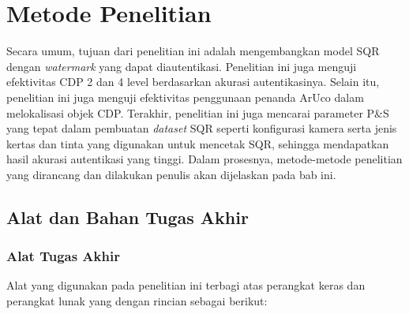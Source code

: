 \chapter{Metode Penelitian}
Secara umum, tujuan dari penelitian ini adalah mengembangkan model SQR dengan \emph{watermark} yang dapat diautentikasi. Penelitian ini juga menguji
efektivitas CDP 2 dan 4 level berdasarkan akurasi autentikasinya. Selain itu, penelitian ini juga menguji efektivitas penggunaan penanda ArUco dalam
melokalisasi objek CDP. Terakhir, penelitian ini juga mencarai parameter P\&S yang tepat dalam pembuatan \emph{dataset} SQR seperti konfigurasi kamera serta
jenis kertas dan tinta yang digunakan untuk mencetak SQR, sehingga mendapatkan hasil akurasi autentikasi yang tinggi. Dalam prosesnya, metode-metode penelitian
yang dirancang dan dilakukan penulis akan dijelaskan pada bab ini.

\section{Alat dan Bahan Tugas Akhir}

\subsection{Alat Tugas Akhir}

Alat yang digunakan pada penelitian ini terbagi atas perangkat keras dan perangkat lunak yang dengan rincian sebagai berikut:

